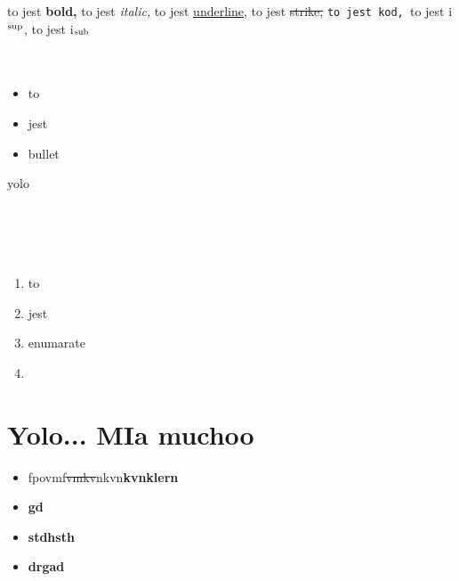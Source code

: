 \documentclass{article}
\begin{document}
to jest \textbf{bold, }to jest \textit{italic, }to jest \uline{underline,} to jest \sout{strike, }\texttt{to jest kod, }to jest i$^{\textnormal{sup}}$, to jest i$_{\textnormal{sub}}$\\\\\\\begin{itemize}\item to\item jest\item bullet\end{itemize}yolo\\\\\\\\\\\begin{enumerate}\item to\item jest\item enumarate\item \end{enumerate}
\section{Yolo... MIa muchoo}
\begin{itemize}\item fpovmf\sout{vmkv}nkvn\textbf{kvnklern}\item \textbf{gd}\item \textbf{stdhsth}\item \textbf{drgad}\end{itemize}
\end{document}
